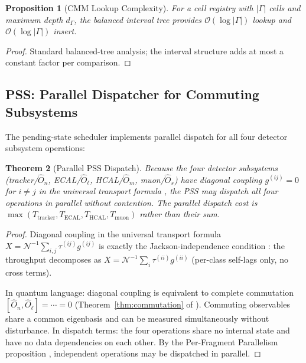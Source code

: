 \documentclass[twocolumn,10pt,a4paper]{article}
\theoremstyle{thmstyle}
\newtheorem{theorem}{Theorem}[section]
\newtheorem{proposition}[theorem]{Proposition}
\theoremstyle{definition}
\theoremstyle{remark}
\newcommand{\TP}{X}
\newcommand{\lag}{\tau}
\newcommand{\cpl}{g}
\begin{document}
\begin{proposition}[CMM Lookup Complexity]
\label{prop:cmm_lookup}
For a cell registry with $|\Gamma|$ cells and maximum depth $d_\Gamma$,
the balanced interval tree provides $\mathcal{O}(\log|\Gamma|)$ lookup
and $\mathcal{O}(\log|\Gamma|)$ insert.
\end{proposition}

\begin{proof}
Standard balanced-tree analysis; the interval structure adds at most a
constant factor per comparison.
\end{proof}

\subsection{PSS: Parallel Dispatcher for Commuting Subsystems}

The pending-state scheduler implements parallel dispatch for all four
detector subsystem operations:

\begin{theorem}[Parallel PSS Dispatch]
\label{thm:parallel_pss}
Because the four detector subsystems (tracker/$\hat{O}_n$,
ECAL/$\hat{O}_\ell$, HCAL/$\hat{O}_m$, muon/$\hat{O}_s$) have diagonal
coupling $g^{(ij)} = 0$ for $i \neq j$ in the universal transport formula
\citep{companion:transport}, the PSS may dispatch all four operations in
parallel without contention. The parallel dispatch cost is
$\max(T_{\mathrm{tracker}}, T_{\mathrm{ECAL}}, T_{\mathrm{HCAL}}, T_{\mathrm{muon}})$
rather than their sum.
\end{theorem}

\begin{proof}
Diagonal coupling in the universal transport formula
$\TP = \mathcal{N}^{-1}\sum_{i,j}\lag^{(ij)}\cpl^{(ij)}$
is exactly the Jackson-independence condition
\citep{companion:transport}: the throughput decomposes as
$\TP = \mathcal{N}^{-1}\sum_i \lag^{(ii)}\cpl^{(ii)}$
(per-class self-lags only, no cross terms).

In quantum language: diagonal coupling is equivalent to complete commutation
$[\hat{O}_n, \hat{O}_\ell] = \cdots = 0$
(Theorem~\ref{thm:commutation} of \citealt{companion:qnd}).
Commuting observables share a common eigenbasis and can be measured
simultaneously without disturbance. In dispatch terms: the four operations
share no internal state and have no data dependencies on each other.
By the Per-Fragment Parallelism proposition \citep{companion:kernel},
independent operations may be dispatched in parallel.
\end{proof}
\end{document}
